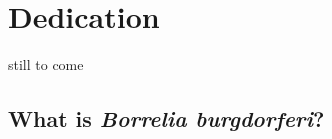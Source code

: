 \documentclass[12pt,twoside]{reedthesis}
\begin{document}
	\chapter*{Dedication}
	
	still to come

  \mainmatter %
  \pagestyle{fancyplain} %


         

\doublespacing
	

\section{What is \textit{Borrelia burgdorferi}?}
\newcommand{\FAstdfit}{r = $\frac{\Delta r \cdot P}{K_{d} + P }$ + $r_{min}$}
\newcommand{\micro}{$\mu$}
\end{document}
